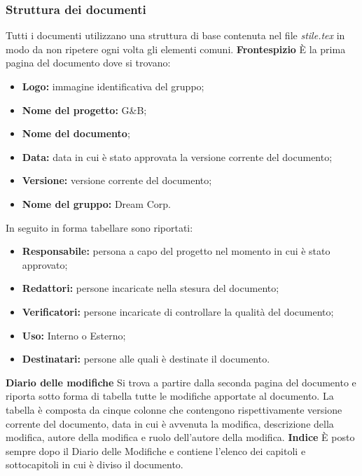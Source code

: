 		\subsubsection{Struttura dei documenti}
			Tutti i documenti utilizzano una struttura di base contenuta nel file \textit{stile.tex} in modo da non ripetere ogni volta gli elementi comuni.
			\newline \newline \textbf{Frontespizio} È la prima pagina del documento dove si trovano:
			\begin{itemize}
				\item \textbf{Logo:} immagine identificativa del gruppo;
				\item \textbf{Nome del progetto:} G\&B;
				\item \textbf{Nome del documento};
				\item \textbf{Data:} data in cui è stato approvata la versione corrente del documento;
				\item \textbf{Versione:} versione corrente del documento;
				\item \textbf{Nome del gruppo:} Dream Corp.
			\end{itemize}
			In seguito in forma tabellare sono riportati:
			\begin{itemize}
				\item \textbf{Responsabile:} persona a capo del progetto nel momento in cui è stato approvato;
				\item \textbf{Redattori:} persone incaricate nella stesura del documento;
				\item \textbf{Verificatori:} persone incaricate di controllare la qualità del documento;
				\item \textbf{Uso:} Interno o Esterno;
				\item \textbf{Destinatari:} persone alle quali è destinate il documento.
			\end{itemize}
		\textbf{Diario delle modifiche}  Si trova a partire dalla seconda pagina del documento e riporta sotto forma di tabella tutte le modifiche apportate al documento. La tabella è composta da cinque colonne che contengono rispettivamente versione corrente del documento, data in cui è avvenuta la modifica, descrizione della modifica, autore della modifica e ruolo dell'autore della modifica.
		\newline \newline \textbf{Indice}  È posto sempre dopo il Diario delle Modifiche e contiene l'elenco dei capitoli e sottocapitoli in cui è diviso il documento.
